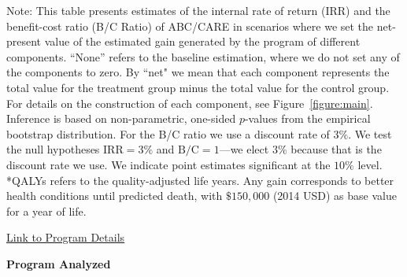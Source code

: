 \documentclass[static]{JJH-Beamer}
\begin{document}
\begin{frame}
{\flushleft \tiny Note: This table presents estimates of the internal rate of return (IRR) and the benefit-cost ratio (B/C Ratio) of ABC/CARE in scenarios where we set the net-present value of the estimated gain generated by the program of different components. ``None'' refers to the baseline estimation, where we do not set any of the components to zero. By ``net" we mean that each component represents the total value for the treatment group minus the total value for the control group. For details on the construction of each component, see Figure~\ref{figure:main}. Inference is based on non-parametric, one-sided $p$-values from the empirical bootstrap distribution. For the B/C ratio we use a discount rate of $3\%$. We test the null hypotheses $\text{IRR} = 3\%$ and $\text{B/C} = 1$---we elect $3\%$ because that is the discount rate we use. We indicate point estimates significant at the $10\%$ level. \\
*QALYs refers to the quality-adjusted life years. Any gain corresponds to better health conditions until predicted death, with $\$150,000$ (2014 USD) as base value for a year of life.\\}

\end{frame}

\begin{frame}

\hypertarget{ret:scrambledeggs}{}
\begin{center}
\hyperlink{scrambledeggs}{\underline{Link to Program Details}}
\end{center}

\end{frame}

\begin{frame}

\begin{block}{}
\begin{center}
\textbf{Program Analyzed}
\end{center}
\end{block}

\end{frame}
\end{document}
